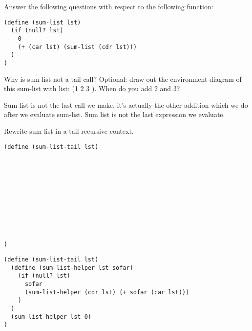 \begin{blocksection}
Answer the following questions with respect to the following function:

\begin{lstlisting}
(define (sum-list lst)
  (if (null? lst)
    0
    (+ (car lst) (sum-list (cdr lst)))
  )
)
\end{lstlisting}

\vspace{2\baselineskip}

\question Why is sum-list not a tail call? Optional: draw out the environment diagram of this sum-list with list: (1 2 3
). When do you add 2 and 3?

\begin{solution}[0.5in]
Sum list is not the last call we make, it's actually the other addition which we do after we evaluate sum-list.
Sum list is not the last expression we evaluate.
\end{solution}
\end{blocksection}

\newpage

\begin{blocksection}
\question Rewrite sum-list in a tail recursive context.

\begin{lstlisting}
(define (sum-list-tail lst)











)
\end{lstlisting}

\begin{solution}[0.5in]
\begin{lstlisting}
(define (sum-list-tail lst)
  (define (sum-list-helper lst sofar)
    (if (null? lst)
      sofar
      (sum-list-helper (cdr lst) (+ sofar (car lst)))
    )
  )
  (sum-list-helper lst 0)
)
\end{lstlisting}
\end{solution}

\end{blocksection}
